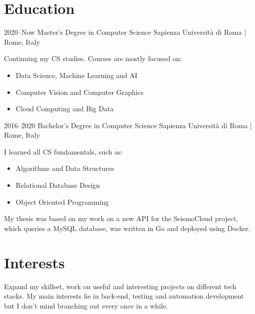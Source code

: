 \documentclass[]{cv-style}          %
\begin{document}

\section{Education}

\begin{entrylist}
\entry
{2020--Now}
{Master's Degree in Computer Science}
{Sapienza Università di Roma | Rome, Italy}
{Continuing my CS studies. Courses are mostly focused on: 
\begin{itemize}
    \item Data Science, Machine Learning and AI
    \item Computer Vision and Computer Graphics
    \item Cloud Computing and Big Data
\end{itemize}
}
\entry
{2016--2020}
{Bachelor's Degree in Computer Science}
{Sapienza Università di Roma | Rome, Italy}
{I learned all CS fundamentals, such as:
\begin{itemize}
    \item Algorithms and Data Structures
    \item Relational Database Design
    \item Object Oriented Programming
\end{itemize}
My thesis was based on my work on a new API for the SeismoCloud project, which queries a MySQL database, was written in Go and deployed using Docker.
}
\end{entrylist}


\section{Interests}

\begin{entrylist}
\entry
{} %
{{\normalfont 
Expand my skillset, work on useful and interesting projects on different tech stacks. My main interests lie in back-end, testing and automation development but I don't mind branching out every once in a while.}}
{}
{\vspace{-0.5cm}}
\end{entrylist}
\end{document}

